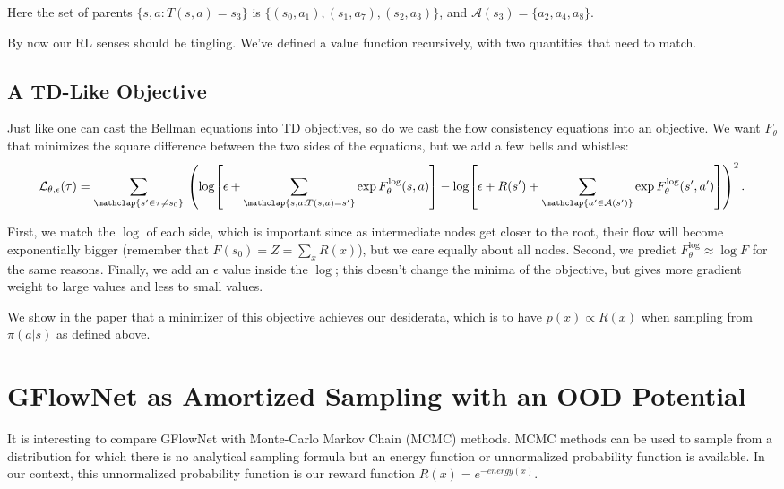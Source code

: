 
Here the set of parents $\{s,a:T(s,a)=s_3\}$ is $\{(s_0, a_1), (s_1, a_7), (s_2, a_3)\}$, and $\mathcal{A}(s_3)=\{a_2,a_4,a_8\}$.

By now our RL senses should be tingling. We've defined a value function recursively, with two quantities that need to match.

\subsection{A TD-Like Objective}

Just like one can cast the Bellman equations into TD objectives, so do we cast the flow consistency equations into an objective.
We want $F_\theta$ that minimizes the square difference between the two sides of the equations, but we add a few bells and whistles:
$$\mathcal{L}_{\theta,\epsilon}(\tau) = \sum_{\mathclap{s'\in\tau\neq s_0}}\,\left(\log\! \left[\epsilon+{\sum_{\mathclap{s,a:T(s,a)=s'}}} \exp F^{\log}_\theta(s,a)\right] - \log\! \left[ \epsilon + R(s') + \sum_{\mathclap{a'\in {\cal A}(s')}} \exp F^{\log}_\theta(s',a')\right]\right)^2.$$

First, we match the $\log$ of each side, which is important since as intermediate nodes get closer to the root, their flow will become exponentially bigger (remember that $F(s_0) = Z = \sum_x R(x)$), but we care equally about all nodes. Second, we predict $F^{\log}_\theta\approx\log F$ for the same reasons. Finally, we add an $\epsilon $ value inside the $\log$; this doesn't change the minima of the objective, but gives more gradient weight to large values and less to small values.

We show in the paper that a minimizer of this objective achieves our desiderata, which is to have $p(x)\propto R(x)$ when sampling from $\pi(a|s)$ as defined above.

\section{GFlowNet as Amortized Sampling with an OOD Potential}

It is interesting to compare GFlowNet with Monte-Carlo Markov Chain (MCMC) methods. MCMC methods can be used to sample from a distribution for which there is no analytical sampling formula but an energy function or unnormalized probability function is available. In our context, this unnormalized probability function is our reward function $R(x)=e^{-energy(x)}$. 

